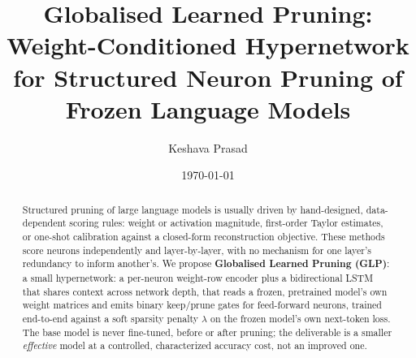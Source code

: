 \documentclass[11pt]{article}
\title{Globalised Learned Pruning: Weight-Conditioned Hypernetwork for Structured Neuron Pruning of Frozen Language Models}
\author{Keshava Prasad}
\date{\today}
\begin{document}
\maketitle

\begin{abstract}
Structured pruning of large language models is usually driven by hand-designed,
data-dependent scoring rules: weight or activation magnitude, first-order
Taylor estimates, or one-shot calibration against a closed-form reconstruction
objective. These methods score neurons independently and layer-by-layer, with
no mechanism for one layer's redundancy to inform another's. We propose
\textbf{Globalised Learned Pruning (GLP)}: a small hypernetwork: a per-neuron
weight-row encoder plus a bidirectional LSTM that shares context across
network depth, that reads a frozen, pretrained model's own weight matrices
and emits binary keep/prune gates for feed-forward neurons, trained
end-to-end against a soft sparsity penalty $\lambda$ on the frozen model's own
next-token loss. The base model is never fine-tuned, before or after pruning;
the deliverable is a smaller \emph{effective} model at a controlled, characterized
accuracy cost, not an improved one.


\end{abstract}
\end{document}
